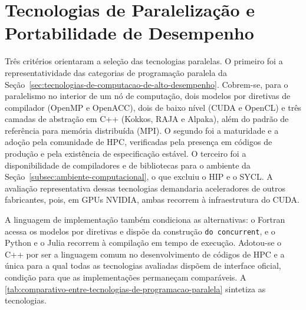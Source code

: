 
\section{Tecnologias de Paralelização e Portabilidade de Desempenho}\label{sec:tecnologias-de-paralelizacao}

Três critérios orientaram a seleção das tecnologias paralelas.
O primeiro foi a representatividade das categorias de programação paralela da Seção~\ref{sec:tecnologias-de-computacao-de-alto-desempenho}.
Cobrem-se, para o paralelismo no interior de um nó de computação, dois modelos por diretivas de compilador (OpenMP e OpenACC), dois de baixo nível (CUDA e OpenCL) e três camadas de abstração em C++ (Kokkos, RAJA e Alpaka), além do padrão de referência para memória distribuída (MPI).
O segundo foi a maturidade e a adoção pela comunidade de HPC, verificadas pela presença em códigos de produção e pela existência de especificação estável.
O terceiro foi a disponibilidade de compiladores e de bibliotecas para o ambiente da Seção~\ref{subsec:ambiente-computacional}, o que excluiu o HIP e o SYCL.
A avaliação representativa dessas tecnologias demandaria aceleradores de outros fabricantes, pois, em GPUs NVIDIA, ambas recorrem à infraestrutura do CUDA.

A linguagem de implementação também condiciona as alternativas: o Fortran acessa os modelos por diretivas e dispõe da construção \texttt{do concurrent}, e o Python e o Julia recorrem à compilação em tempo de execução.
Adotou-se o C++ por ser a linguagem comum no desenvolvimento de códigos de HPC e a única para a qual todas as tecnologias avaliadas dispõem de interface oficial, condição para que as implementações permaneçam comparáveis.
A \autoref{tab:comparativo-entre-tecnologias-de-programacao-paralela} sintetiza as tecnologias.

